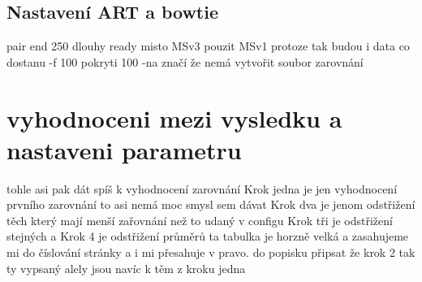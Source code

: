 \documentclass[czech,DP]{thesiskiv}
\numberwithin{equation}{section}
\begin{document}
\section{Nastavení ART a bowtie}

pair end
250 dlouhy ready
misto MSv3 pouzit MSv1 protoze tak budou i data co dostanu
-f 100 pokryti 100
-na značí že nemá vytvořit soubor zarovnání
\chapter{vyhodnoceni mezi vysledku a nastaveni parametru}
tohle asi pak dát spíš k vyhodnocení zarovnání
Krok jedna je jen vyhodnocení prvního zarovnání to asi nemá moc smysl sem dávat
Krok dva je jenom odstřižení těch který mají menší zařovnání než to udaný v configu 
Krok tři je odstřižení stejných a 
Krok 4 je odstřižení průměrů 
ta tabulka je horzně velká a zasahujeme mi do číslování stránky a i mi přesahuje v pravo.
do popisku připsat že krok 2 tak ty vypsaný alely jsou navíc k těm z kroku jedna
\end{document}

